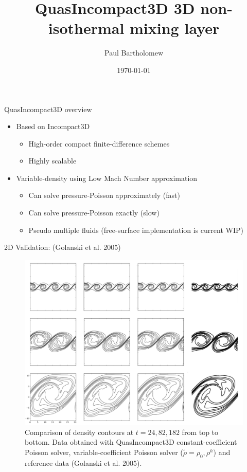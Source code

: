 \documentclass[presentation]{beamer}
\author{Paul Bartholomew}
\date{\today}
\title{QuasIncompact3D 3D non-isothermal mixing layer}
\begin{document}
\maketitle

\begin{frame}[label=sec-1]{QuasIncompact3D overview}
\begin{itemize}
\item Based on Incompact3D
\begin{itemize}
\item High-order compact finite-difference schemes
\item Highly scalable
\end{itemize}
\item Variable-density using Low Mach Number approximation
\begin{itemize}
\item Can solve pressure-Poisson approximately (fast)
\item Can solve pressure-Poisson exactly (slow)
\item Pseudo multiple fluids (free-surface implementation is current WIP)
\end{itemize}
\end{itemize}
\end{frame}

\begin{frame}[label=sec-2]{2D Validation: (Golanski et al. 2005)}
\begin{figure}[htb]
\centering
\includegraphics[width=0.75\linewidth]{./figures/golanski2d-rho.png}
\caption{Comparison of density contours at $t=24,82,182$ from top to bottom. Data obtained with QuasIncompact3D constant-coefficient Poisson solver, variable-coefficient Poisson solver ($\widetilde{\rho} = \rho_0, \rho^h$) and reference data (Golanski et al. 2005).}
\end{figure}
\end{frame}
\end{document}
